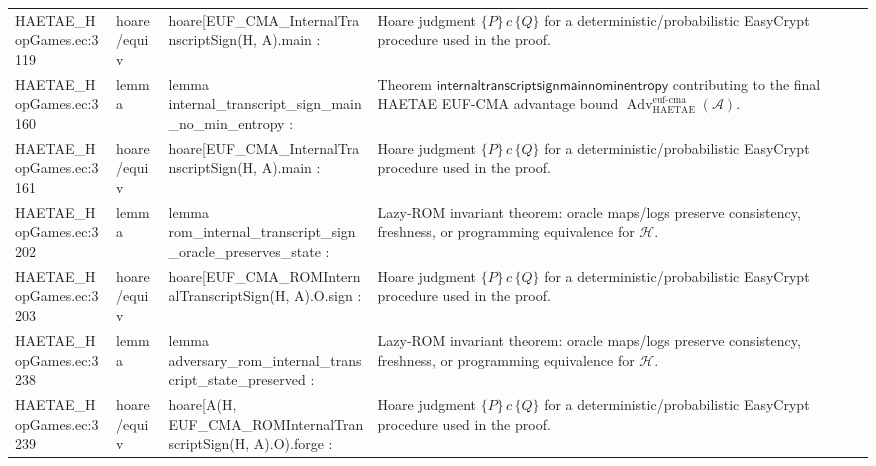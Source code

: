 \documentclass[10pt]{article}
\newcommand{\Adv}{\operatorname{Adv}}
\begin{document}
\begin{longtable}{L{0.11\textwidth}L{0.055\textwidth}L{0.385\textwidth}L{0.41\textwidth}}
HAETAE\_\allowbreak{}HopGames.\allowbreak{}ec:\allowbreak{}3119 & hoare/equiv & {\ttfamily\scriptsize hoare[EUF\_\allowbreak{}CMA\_\allowbreak{}InternalTranscriptSign(H, A).main :} & Hoare judgment $\{P\}\,c\,\{Q\}$ for a deterministic/probabilistic EasyCrypt procedure used in the proof. \\
HAETAE\_\allowbreak{}HopGames.\allowbreak{}ec:\allowbreak{}3160 & lemma & {\ttfamily\scriptsize lemma internal\_\allowbreak{}transcript\_\allowbreak{}sign\_\allowbreak{}main\_\allowbreak{}no\_\allowbreak{}min\_\allowbreak{}entropy :} & Theorem $\mathsf{internaltranscriptsignmainnominentropy}$ contributing to the final HAETAE EUF-CMA advantage bound $\Adv_{\mathrm{HAETAE}}^{\mathrm{euf\mbox{-}cma}}(\mathcal A)$. \\
HAETAE\_\allowbreak{}HopGames.\allowbreak{}ec:\allowbreak{}3161 & hoare/equiv & {\ttfamily\scriptsize hoare[EUF\_\allowbreak{}CMA\_\allowbreak{}InternalTranscriptSign(H, A).main :} & Hoare judgment $\{P\}\,c\,\{Q\}$ for a deterministic/probabilistic EasyCrypt procedure used in the proof. \\
HAETAE\_\allowbreak{}HopGames.\allowbreak{}ec:\allowbreak{}3202 & lemma & {\ttfamily\scriptsize lemma rom\_\allowbreak{}internal\_\allowbreak{}transcript\_\allowbreak{}sign\_\allowbreak{}oracle\_\allowbreak{}preserves\_\allowbreak{}state :} & Lazy-ROM invariant theorem: oracle maps/logs preserve consistency, freshness, or programming equivalence for $\mathcal H$. \\
HAETAE\_\allowbreak{}HopGames.\allowbreak{}ec:\allowbreak{}3203 & hoare/equiv & {\ttfamily\scriptsize hoare[EUF\_\allowbreak{}CMA\_\allowbreak{}ROMInternalTranscriptSign(H, A).O.sign :} & Hoare judgment $\{P\}\,c\,\{Q\}$ for a deterministic/probabilistic EasyCrypt procedure used in the proof. \\
HAETAE\_\allowbreak{}HopGames.\allowbreak{}ec:\allowbreak{}3238 & lemma & {\ttfamily\scriptsize lemma adversary\_\allowbreak{}rom\_\allowbreak{}internal\_\allowbreak{}transcript\_\allowbreak{}state\_\allowbreak{}preserved :} & Lazy-ROM invariant theorem: oracle maps/logs preserve consistency, freshness, or programming equivalence for $\mathcal H$. \\
HAETAE\_\allowbreak{}HopGames.\allowbreak{}ec:\allowbreak{}3239 & hoare/equiv & {\ttfamily\scriptsize hoare[A(H, EUF\_\allowbreak{}CMA\_\allowbreak{}ROMInternalTranscriptSign(H, A).O).forge :} & Hoare judgment $\{P\}\,c\,\{Q\}$ for a deterministic/probabilistic EasyCrypt procedure used in the proof. \\

\end{longtable}
\end{document}
